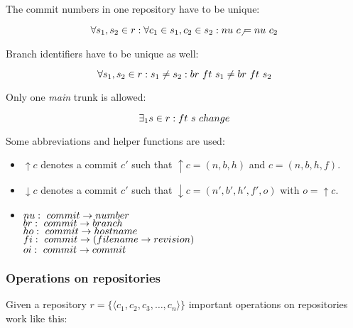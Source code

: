 \documentclass[fleqn, german, 10pt, a4paper]{article}
\begin{document}
The commit numbers in one repository have to be unique:

\begin{displaymath}
\forall s_1, s_2 \in r: \forall c_1 \in s_1, c_2 \in s_2: \mathnormal{nu}\ c_
\neq \mathnormal{nu}\ c_2
\end{displaymath}

Branch identifiers have to be unique as well:

\begin{displaymath}
\forall s_1, s_2 \in r: s_1 \neq s_2: \mathnormal{br}\ \mathnormal{ft}\ s_1
\neq \mathnormal{br}\ \mathnormal{ft}\ s_2
\end{displaymath}

Only one \emph{main} trunk is allowed:

\begin{displaymath}
\exists_1 s\in r : \mathnormal{ft}\ s \ \mathnormal{change}
\end{displaymath}

Some abbreviations and helper functions are used:

\begin{itemize}
\item $\uparrow c$ denotes a commit $c'$ such that $\uparrow c = (n, b, h)$
and $c=(n, b, h, f)$.
\item $\downarrow c$ denotes a commit $c'$ such that $\downarrow
c = (n', b', h', f', o)$ with $o = \uparrow c$.
\item $\mathnormal{nu}:\ \mathnormal{commit} \rightarrow \mathnormal{number}$ \\
$\mathnormal{br}:\ \mathnormal{commit} \rightarrow \mathnormal{branch}$ \\
$\mathnormal{ho}:\ \mathnormal{commit} \rightarrow \mathnormal{hostname}$ \\
$\mathnormal{fi}:\ \mathnormal{commit} \rightarrow (\mathnormal{filename} \rightarrow \mathnormal{revision})$ \\
$\mathnormal{oi}:\ \mathnormal{commit} \rightarrow \mathnormal{commit}$
\end{itemize}

\subsubsection{Operations on repositories}

Given a repository $r = \{\langle c_1, c_2, c_3, \ldots, c_n\rangle\}$ 
important operations on repositories work like this:
\end{document}
